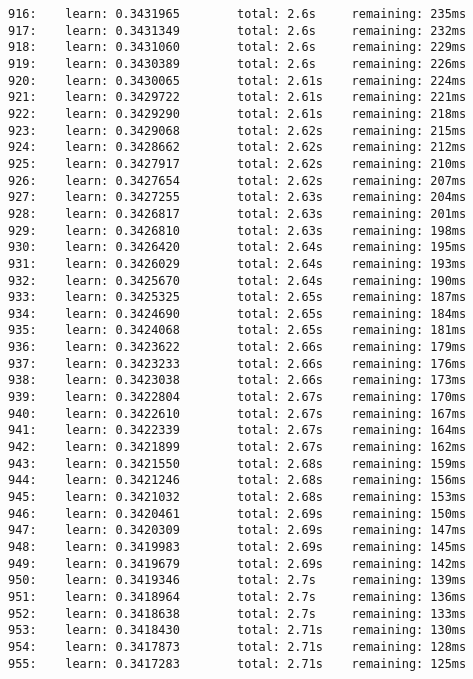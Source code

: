 \documentclass[11pt]{article}
\begin{document}
\begin{Verbatim}[commandchars=\\\{\}]
916:    learn: 0.3431965        total: 2.6s     remaining: 235ms
917:    learn: 0.3431349        total: 2.6s     remaining: 232ms
918:    learn: 0.3431060        total: 2.6s     remaining: 229ms
919:    learn: 0.3430389        total: 2.6s     remaining: 226ms
920:    learn: 0.3430065        total: 2.61s    remaining: 224ms
921:    learn: 0.3429722        total: 2.61s    remaining: 221ms
922:    learn: 0.3429290        total: 2.61s    remaining: 218ms
923:    learn: 0.3429068        total: 2.62s    remaining: 215ms
924:    learn: 0.3428662        total: 2.62s    remaining: 212ms
925:    learn: 0.3427917        total: 2.62s    remaining: 210ms
926:    learn: 0.3427654        total: 2.62s    remaining: 207ms
927:    learn: 0.3427255        total: 2.63s    remaining: 204ms
928:    learn: 0.3426817        total: 2.63s    remaining: 201ms
929:    learn: 0.3426810        total: 2.63s    remaining: 198ms
930:    learn: 0.3426420        total: 2.64s    remaining: 195ms
931:    learn: 0.3426029        total: 2.64s    remaining: 193ms
932:    learn: 0.3425670        total: 2.64s    remaining: 190ms
933:    learn: 0.3425325        total: 2.65s    remaining: 187ms
934:    learn: 0.3424690        total: 2.65s    remaining: 184ms
935:    learn: 0.3424068        total: 2.65s    remaining: 181ms
936:    learn: 0.3423622        total: 2.66s    remaining: 179ms
937:    learn: 0.3423233        total: 2.66s    remaining: 176ms
938:    learn: 0.3423038        total: 2.66s    remaining: 173ms
939:    learn: 0.3422804        total: 2.67s    remaining: 170ms
940:    learn: 0.3422610        total: 2.67s    remaining: 167ms
941:    learn: 0.3422339        total: 2.67s    remaining: 164ms
942:    learn: 0.3421899        total: 2.67s    remaining: 162ms
943:    learn: 0.3421550        total: 2.68s    remaining: 159ms
944:    learn: 0.3421246        total: 2.68s    remaining: 156ms
945:    learn: 0.3421032        total: 2.68s    remaining: 153ms
946:    learn: 0.3420461        total: 2.69s    remaining: 150ms
947:    learn: 0.3420309        total: 2.69s    remaining: 147ms
948:    learn: 0.3419983        total: 2.69s    remaining: 145ms
949:    learn: 0.3419679        total: 2.69s    remaining: 142ms
950:    learn: 0.3419346        total: 2.7s     remaining: 139ms
951:    learn: 0.3418964        total: 2.7s     remaining: 136ms
952:    learn: 0.3418638        total: 2.7s     remaining: 133ms
953:    learn: 0.3418430        total: 2.71s    remaining: 130ms
954:    learn: 0.3417873        total: 2.71s    remaining: 128ms
955:    learn: 0.3417283        total: 2.71s    remaining: 125ms

\end{Verbatim}
\end{document}
